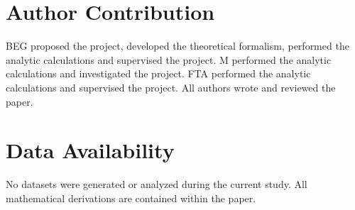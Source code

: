 \documentclass[11pt]{article}
\numberwithin{equation}{section}
\theoremstyle{plain}
\theoremstyle{definition}
\theoremstyle{remark}
\begin{document}
\section*{Author Contribution}
BEG proposed the project, developed the theoretical formalism, performed the analytic calculations and supervised the project. M performed the analytic calculations and investigated the project. FTA performed the analytic calculations and supervised the project. All authors wrote and reviewed the paper.

\section*{Data Availability }
No datasets were generated or analyzed during the current study. All mathematical derivations are contained within the paper.
\end{document}
